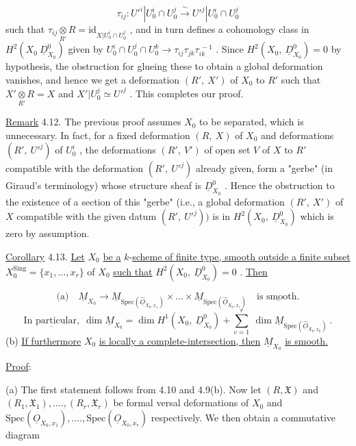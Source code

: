 $$\tau_{ij} : U'^i|U_0^i \cap U_0^j \xrightarrow{\ \sim\ } U'^j|U_0^i \cap U_0^j$$
such that  $\tau_{ij} \underset{R'}{\otimes} R = \mathrm{id}_{X|U_0^i \cap U_0^j}$ , and in turn defines a cohomology class in $H^2(X_0\ \underline{D}^0_{X_0})$  given by  $U_0^i \cap U_0^j \cap U_0^k \to \tau_{ij}\tau_{jk}\tau_{ik}^{\ -1}$ . Since  $H^2(X_0,\ \underline{D}^0_{X_0}) = 0$  by hypothesis, the obstruction for glueing these to obtain a global deformation vanishes, and hence we get a deformation  $(R',\ X')$  of  $X_0$  to  $R'$  such that $X' \underset{R'}{\otimes} R = X$  and  $X'|U_0^j \simeq U'^j$ . This completes our proof.

\underline{Remark} 4.12.  The previous proof assumes  $X_0$  to be separated, which is unnecessary. In fact, for a fixed deformation  $(R,\ X)$  of  $X_0$  and deformations  $(R',\ U'^j)$  of $U_0^i$ , the deformations  $(R',\ V')$  of open set  $V$  of  $X$  to  $R'$  compatible with the deformation  $(R',\ U'^j)$  already given, form a  "gerbe"  (in Giraud's terminology) whose structure sheaf is  $\underline{D}^0_{X_0}$ . Hence the obstruction to the existence of a section of this  "gerbe"  (i.e., a global deformation  $(R',\ X')$  of  $X$  compatible with the given datum  $(R',\ U'^j))$  is in $H^2(X_0,\ \underline{D}^0_{X_0})$  which is zero by assumption.

\underline{Corollary} 4.13.  \underline{Let}  $X_0$  \underline{be a} $k$-\underline{scheme of finite type, smooth outside a finite subset}  $X_0^{\mathrm{Sing}} = \{x_1,\dots,x_r\}$  of  $X_0$  \underline{such that}  $H^2(X_0,\ \underline{D}^0_{X_0}) = 0$ . \underline{Then}

$$\text{(a)}\quad \underline{M}_{X_0} \to \underline{M}_{\mathrm{Spec}(\widehat{\underline{O}}_{X_0,x_1})} \times\dots\times \underline{M}_{\mathrm{Spec}(\widehat{\underline{O}}_{X_0,x_r})}\quad \underline{\text{is smooth.}}$$
$$\underline{\text{In particular,}}\ \ \dim \underline{M}_{X_0} = \dim H^1(X_0,\ \underline{D}^0_{X_0}) + \sum_{c=1}^{r} \ \dim \underline{M}_{\mathrm{Spec}(\widehat{\underline{O}}_{X_0,x_0})}\ .$$
(b)  \underline{If furthermore}  $X_0$  \underline{is locally a complete-intersection, then}  $\underline{M}_{X_0}$ \underline{is smooth.}


\underline{Proof}:

(a)  The first statement follows from 4.10 and 4.9(b). Now let  $(R, \mathfrak{X})$  and  $(R_1, \mathfrak{X}_1),....,(R_r, \mathfrak{X}_r)$  be formal versal deformations of  $X_0$  and  $\mathrm{Spec}(\underline{O}_{X_0,x_1}),....,\mathrm{Spec}(\underline{O}_{X_0,x_r})$  respectively. We then obtain a commutative diagram

